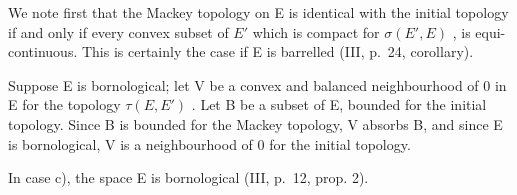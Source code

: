 We note first that the Mackey topology on E is identical with the initial topology if and only if every convex subset of \(E'\) which is compact for \(\sigma(E', E)\) , is equi-continuous. This is certainly the case if E is barrelled (III, p.~24, corollary).

Suppose E is bornological; let V be a convex and balanced neighbourhood of 0 in E for the topology \(\tau(E, E')\) . Let B be a subset of E, bounded for the initial topology. Since B is bounded for the Mackey topology, V absorbs B, and since E is bornological, V is a neighbourhood of 0 for the initial topology.

In case c), the space E is bornological (III, p.~12, prop. 2).

